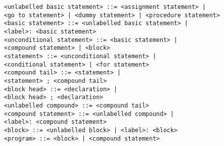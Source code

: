 \documentclass[a4paper,11pt]{article}
\begin{document}
\begin{flushleft}
\vspace{0.2em}\texttt{<unlabelled basic statement> ::= <assignment statement> |\\
  \hspace{1.0cm}<go to statement> | <dummy statement> | <procedure statement>}\\

\vspace{0.2em}\texttt{<basic statement> ::= <unlabelled basic statement> |\\
  \hspace{1.0cm}<label>: <basic statement>}\\

\vspace{0.2em}\texttt{<unconditional statement> ::= <basic statement> |\\
  \hspace{1.0cm}<compound statement> | <block>}\\

\vspace{0.2em}\texttt{<statement> ::= <unconditional statement> |\\
  \hspace{1.0cm}<conditional statement> | <for statement>}\\

\vspace{0.2em}\texttt{<compound tail> ::= <statement>  |\\
  \hspace{1.0cm}<statement> ; <compound tail>}\\

\vspace{0.2em}\texttt{<block head> ::=  <declaration> |\\
  \hspace{1.0cm}<block head> ; <declaration>}\\

\vspace{0.2em}\texttt{<unlabelled compound> ::=  <compound tail>}\\

\vspace{0.2em}\texttt{<compound statement> ::= <unlabelled compound> |\\
  \hspace{1.0cm}<label>: <compound statement>}\\

\vspace{0.2em}\texttt{<block> ::= <unlabelled block> | <label>: <block>}\\

\vspace{0.2em}\texttt{<program> ::= <block> | <compound statement>}\\
\end{flushleft}
\end{document}
